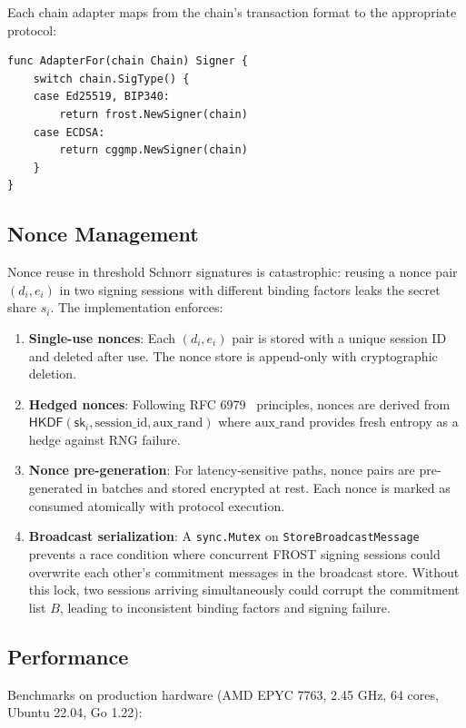\documentclass[11pt,twocolumn]{article}
\begin{document}
Each chain adapter maps from the chain's transaction format to the appropriate
protocol:

\begin{verbatim}
func AdapterFor(chain Chain) Signer {
    switch chain.SigType() {
    case Ed25519, BIP340:
        return frost.NewSigner(chain)
    case ECDSA:
        return cggmp.NewSigner(chain)
    }
}
\end{verbatim}

\subsection{Nonce Management}

Nonce reuse in threshold Schnorr signatures is catastrophic: reusing a nonce pair
$(d_i, e_i)$ in two signing sessions with different binding factors leaks the
secret share $s_i$. The implementation enforces:

\begin{enumerate}[nosep]
  \item \textbf{Single-use nonces}: Each $(d_i, e_i)$ pair is stored with a unique
    session ID and deleted after use. The nonce store is append-only with
    cryptographic deletion.
  \item \textbf{Hedged nonces}: Following RFC 6979~\cite{rfc6979} principles, nonces
    are derived from $\mathsf{HKDF}(\mathsf{sk}_i, \text{session\_id}, \text{aux\_rand})$
    where $\text{aux\_rand}$ provides fresh entropy as a hedge against
    RNG failure.
  \item \textbf{Nonce pre-generation}: For latency-sensitive paths, nonce pairs are
    pre-generated in batches and stored encrypted at rest. Each nonce is marked as
    consumed atomically with protocol execution.
  \item \textbf{Broadcast serialization}: A \texttt{sync.Mutex} on
    \texttt{StoreBroadcastMessage} prevents a race condition where concurrent FROST
    signing sessions could overwrite each other's commitment messages in the broadcast
    store. Without this lock, two sessions arriving simultaneously could corrupt the
    commitment list $B$, leading to inconsistent binding factors and signing failure.
\end{enumerate}

\subsection{Performance}

Benchmarks on production hardware (AMD EPYC 7763, 2.45 GHz, 64 cores, Ubuntu 22.04,
Go 1.22):
\end{document}

